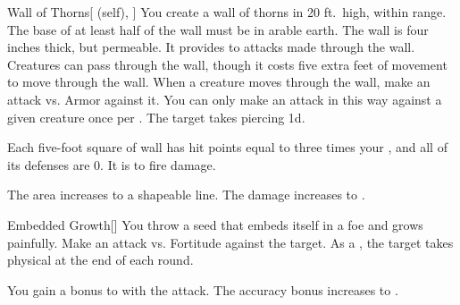 \lowercase{\hypertarget{spell:Wall of Thorns}{}}\label{spell:Wall of Thorns}
\begin{attuneability}[Rank 3]{\hypertarget{spell:Wall of Thorns}{Wall of Thorns}}[ (self), ]
You create a wall of thorns in 20 ft.\ high, \areamed {} within \rngmed range.
The base of at least half of the wall must be in arable earth.
The wall is four inches thick, but permeable.
It provides  to attacks made through the wall.
Creatures can pass through the wall, though it costs five extra feet of movement to move through the wall.
When a creature moves through the wall, make an attack vs. Armor against it.
You can only make an attack in this way against a given creature once per .
\hit The target takes piercing  \minus1d.

Each five-foot square of wall has hit points equal to three times your , and all of its defenses are 0.
It is  to fire damage.

\rankline
{} The area increases to a \arealarge shapeable line.
 The damage increases to .
\end{attuneability}
\vspace{0.25em}



\lowercase{\hypertarget{spell:Embedded Growth}{}}\label{spell:Embedded Growth}
\begin{freeability}[Rank 4]{\hypertarget{spell:Embedded Growth}{Embedded Growth}}[]
You throw a seed that embeds itself in a foe and grows painfully.
Make an attack vs. Fortitude against the target.
\hit As a , the target takes physical  at the end of each round.

\rankline
{} You gain a  bonus to  with the attack.
 The accuracy bonus increases to .
\end{freeability}
\vspace{0.25em}



